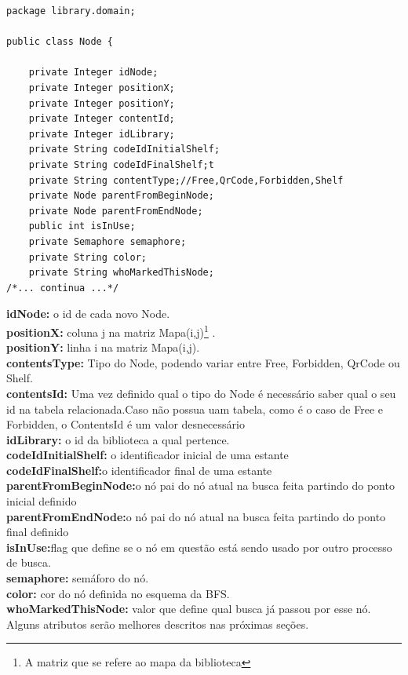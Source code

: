 \documentclass[a4paper,10pt]{article}
\begin{document}
      
      \begin{lstlisting}
package library.domain;

public class Node {
    
    private Integer idNode;
    private Integer positionX;
    private Integer positionY;
    private Integer contentId;
    private Integer idLibrary;
    private String codeIdInitialShelf;
    private String codeIdFinalShelf;t
    private String contentType;//Free,QrCode,Forbidden,Shelf
    private Node parentFromBeginNode;
    private Node parentFromEndNode;
    public int isInUse;
    private Semaphore semaphore;
    private String color;
    private String whoMarkedThisNode;
/*... continua ...*/
\end{lstlisting}
\vspace{1cm}
{\bf idNode:} o id de cada novo Node. \\
{\bf positionX: }coluna j na matriz Mapa(i,j)\footnote{A matriz que se refere ao mapa da biblioteca}      . \\
{\bf positionY: }linha i na matriz Mapa(i,j).\\
{\bf contentsType:} Tipo do Node, podendo variar entre Free, Forbidden, QrCode ou Shelf.\\
{\bf contentsId: }Uma vez definido qual o tipo do Node é necessário saber qual o seu id na tabela relacionada.Caso não possua uam tabela, como é o caso
 de Free e Forbidden, o ContentsId é um valor desnecessário\\
{\bf idLibrary:} o id da biblioteca a qual pertence.\\
{\bf codeIdInitialShelf: }o identificador inicial de uma estante\\
{\bf codeIdFinalShelf:}o identificador final de uma estante\\
{\bf parentFromBeginNode:}o nó pai do nó atual na busca feita partindo do ponto inicial definido \\
{\bf parentFromEndNode:}o nó pai do nó atual na busca feita partindo do ponto final definido\\
{\bf isInUse:}flag que define se o nó em questão está sendo usado por outro processo de busca.\\
{\bf semaphore:} semáforo do nó.\\
{\bf color:} cor do nó definida no esquema da BFS.\\
{\bf whoMarkedThisNode:} valor que define qual busca já passou por esse nó.\\


      Alguns atributos serão melhores descritos nas próximas seções.\\
      
\end{document}
